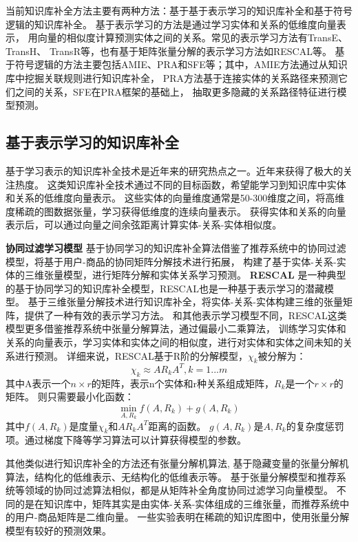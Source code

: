 当前知识库补全方法主要有两种方法：基于基于表示学习的知识库补全和基于符号逻辑的知识库补全。
基于表示学习的方法是通过学习实体和关系的低维度向量表示，
用向量的相似度计算预测实体之间的关系。常见的表示学习方法有TransE\cite{NIPS2013_5071}、TransH\cite{Wang2014KnowledgeGE}、
TransR\cite{Huang2017ImprovedKB}等，也有基于矩阵张量分解的表示学习方法如RESCAL\cite{Nickel2011}等。
基于符号逻辑的方法主要包括AMIE\cite{Galrraga2013AMIEAR}、PRA\cite{Lao2010}和SFE\cite{Gardner2015}等；其中，AMIE方法通过从知识库中挖掘关联规则进行知识库补全，
PRA方法基于连接实体的关系路径来预测它们之间的关系，SFE在PRA框架的基础上，
抽取更多隐藏的关系路径特征进行模型预测。

\subsection{基于表示学习的知识库补全}
\label{cha:presentation}
基于学习表示的知识库补全技术是近年来的研究热点之一。近年来获得了极大的关注热度。
这类知识库补全技术通过不同的目标函数，希望能学习到知识库中实体和关系的低维度向量表示。
这些实体的向量维度通常是50-300维度之间，将高维度稀疏的图数据张量，学习获得低维度的连续向量表示。
获得实体和关系的向量表示后，可以通过向量之间余弦距离计算实体-关系-实体相似度。

\textbf{协同过滤学习模型} 基于协同学习的知识库补全算法借鉴了推荐系统中的协同过滤模型，将基于用户-商品的协同矩阵分解技术进行拓展，
构建了基于实体-关系-实体的三维张量模型，进行矩阵分解和实体关系学习预测。
\textbf{RESCAL} 是一种典型的基于协同学习的知识库补全模型，RESCAL也是一种基于表示学习的潜藏模型。
基于三维张量分解技术进行知识库补全，将实体-关系-实体构建三维的张量矩阵，提供了一种有效的表示学习方法。
和其他表示学习模型不同，RESCAL这类模型更多借鉴推荐系统中张量分解算法，通过偏最小二乘算法，
训练学习实体和关系的向量表示，学习实体和实体之间的相似度，进行对实体和实体之间未知的关系进行预测。
详细来说，RESCAL基于R阶的分解模型，$\chi_k$被分解为：
$$\chi_k \approx AR_{k}A^T, k =1...m$$
其中A表示一个$n\times r$的矩阵，表示n个实体和r种关系组成矩阵，$R_{k}$是一个$r\times r$的矩阵。
则只需要最小化函数：
$$\min \limits_{A,R_k} f(A,R_k)+g(A,R_k)$$
其中$f(A,R_k)$是度量$\chi_k$和$AR_{k}A^T$距离的函数。
$g(A,R_k)$是$A,R_k$的复杂度惩罚项。通过梯度下降等学习算法可以计算获得模型的参数。

其他类似进行知识库补全的方法还有张量分解机算法\cite{Rendle2010FactorizationM},
基于隐藏变量的张量分解机算法\cite{Rendle2012FactorizationMW}，结构化的低维表示\cite{2009EmbeddingLS}、无结构化的低维表示等。
基于张量分解模型和推荐系统等领域的协同过滤算法相似，都是从矩阵补全角度协同过滤学习向量模型。
不同的是在知识库中，矩阵其实是由实体-关系-实体组成的三维张量，而推荐系统中的用户-商品矩阵是二维向量。
一些实验\cite{Dong2014}表明在稀疏的知识库图中，使用张量分解模型有较好的预测效果。

